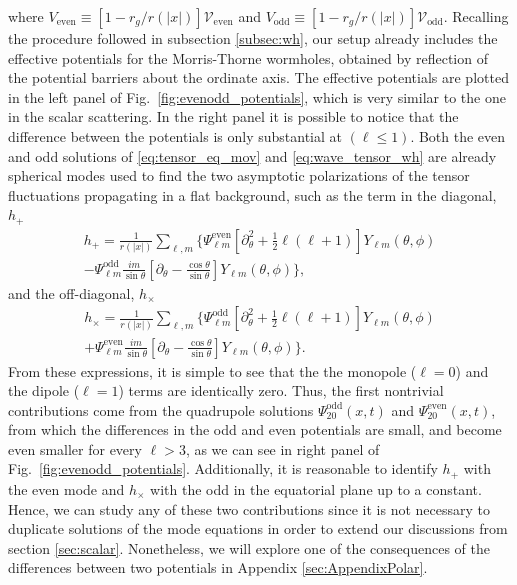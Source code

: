 \documentclass[article,aps,nofootinbib,twocolumn,superscriptaddress]{revtex4-1}
\begin{document}
where $V_{\mathrm{even}}\equiv[1-r_g/r(|x|)]\mathcal{V}_{\mathrm{even}}$ and $V_{\mathrm{odd}}\equiv[1-r_g/r(|x|)]\mathcal{V}_{\mathrm{odd}}$. Recalling the procedure followed in subsection \ref{subsec:wh}, our setup already includes the effective potentials for the Morris-Thorne wormholes, obtained by reflection of the potential barriers about the ordinate axis. The effective potentials are plotted in the left panel of Fig.~\ref{fig:evenodd_potentials}, which is very similar to the one in the scalar scattering. In the right panel it is possible to notice that the difference between the potentials is only substantial at $(\ell\leq1)$. Both the even and odd solutions of \eqref{eq:tensor_eq_mov} and \eqref{eq:wave_tensor_wh} are already spherical modes used to find the two asymptotic polarizations of the tensor fluctuations propagating in a flat background, such as the term in the diagonal, $h_+$ 
\begin{align}
\displaystyle{h_+=\frac{1}{r(|x|)}\sum_{\ell,m}\bigg\{\Psi_{\ell m}^{\mathrm{even}}\left[\partial^2_{\theta}+\frac{1}{2}\ell(\ell+1)\right]Y_{\ell m}(\theta,\phi)}\nonumber\\
\displaystyle{-\Psi_{\ell m}^{\mathrm{odd}}\frac{i m}{\sin\theta}\left[\partial_{\theta}-\frac{\cos\theta}{\sin\theta}\right]Y_{\ell m}(\theta,\phi)\bigg\}},
\label{eq:hplus}
\end{align} 
and the off-diagonal, $h_{\times}$ 
\begin{align}
\displaystyle{h_{\times}=\frac{1}{r(|x|)}\sum_{\ell,m}\bigg\{\Psi_{\ell m}^{\mathrm{odd}}\left[\partial^2_{\theta}+\frac{1}{2}\ell(\ell+1)\right]Y_{\ell m}(\theta,\phi)}\nonumber\\
\displaystyle{+\Psi_{\ell m}^{\mathrm{even}}\frac{i m}{\sin\theta}\left[\partial_{\theta}-\frac{\cos\theta}{\sin\theta}\right]Y_{\ell m}(\theta,\phi)\bigg\}}.
\label{eq:hx}
\end{align}
From these expressions, it is simple to see that the the monopole ($\ell=0$) and the dipole ($\ell=1$) terms are identically zero. Thus, the first nontrivial contributions come from the quadrupole solutions $\Psi_{20}^{\mathrm{odd}}(x,t)$ and $\Psi_{20}^{\mathrm{even}}(x,t)$, from which the differences in the odd and even potentials are small, and become even smaller for every $\ell>3$, as we can see in right panel of Fig.~\ref{fig:evenodd_potentials}. Additionally, it is reasonable to identify $h_+$ with the even mode and  $h_{\times}$ with the odd in the equatorial plane up to a constant. Hence, we can study any of these two contributions since it is not necessary to duplicate solutions of the mode equations in order to extend our discussions from section \ref{sec:scalar}. Nonetheless, we will explore one of the consequences of the differences between two potentials in Appendix \ref{sec:AppendixPolar}.\\ 
\end{document}
